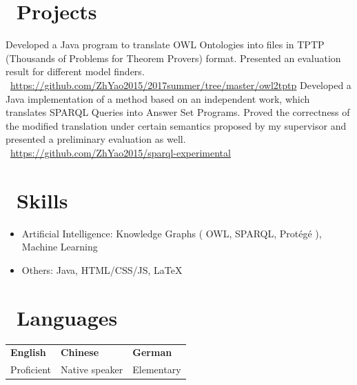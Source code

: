 \documentclass{my_cv}
\begin{document}
	\section{\faFolderOpen\ Projects}
	Developed a Java program to translate OWL Ontologies into files in TPTP (Thousands of Problems for Theorem Provers) format. Presented an evaluation result for different model finders.\\
	\faGithub\  \url{https://github.com/ZhYao2015/2017summer/tree/master/owl2tptp}
	Developed a Java implementation of a method based on an independent work, which translates SPARQL Queries into Answer Set Programs. Proved the correctness of the modified translation under certain semantics proposed by my supervisor and presented a preliminary evaluation as well.\\
	\faGithub\ \url{https://github.com/ZhYao2015/sparql-experimental}
	\section{\faKey\ Skills}
	\begin{itemize}
		\item Artificial Intelligence: Knowledge Graphs ( OWL, SPARQL, Prot\'{e}g\'{e} ), Machine Learning
		\item Others: Java, HTML/CSS/JS, \LaTeX
	\end{itemize}
	\section{\faGlobe\ Languages}
	\vspace{-5mm}
	\begin{table}[h]
		\begin{tabular}{lll}
			{\bfseries \Large English}&{\bfseries \Large Chinese}&{\bfseries \Large German}\\
			Proficient & Native speaker & Elementary\\
		\end{tabular}
	\end{table}
\end{document}
